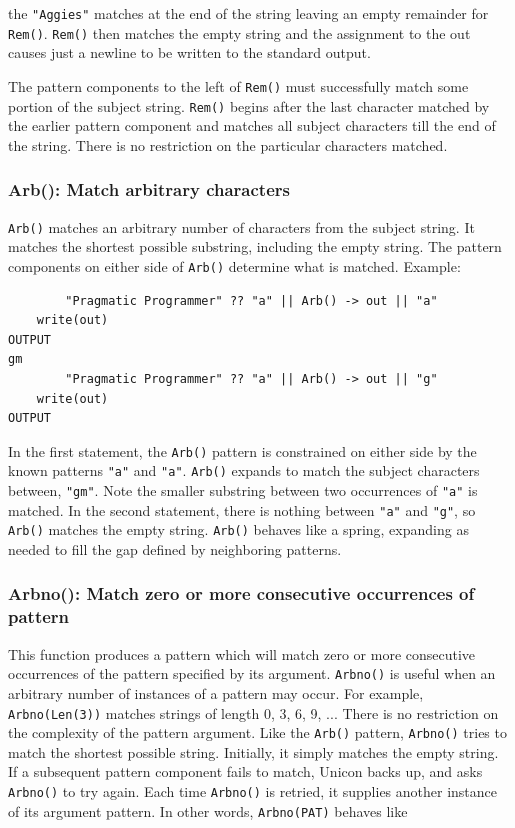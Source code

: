 \documentclass[letterpaper,12pt]{article}
\begin{document}
\noindent the {\tt "Aggies"} matches at the end of the string leaving an empty
remainder for {\tt Rem()}. {\tt Rem()} then matches the empty string
and the assignment to the out causes just a newline to be written to the
standard output.

The pattern components to the left of {\tt Rem()} must successfully match
some portion of the subject string. {\tt Rem()} begins after the last
character matched by the earlier pattern component and matches all
subject characters till the end of the string. There is no restriction
on the particular characters matched.

\subsubsection{Arb(): Match arbitrary characters}

{\tt Arb()} matches an arbitrary number of characters from the subject
string.  It matches the shortest possible substring, including the
empty string. The pattern components on either side of {\tt Arb()} determine
what is matched. Example:

\begin{verbatim}
        "Pragmatic Programmer" ?? "a" || Arb() -> out || "a"
	write(out)
OUTPUT
gm
        "Pragmatic Programmer" ?? "a" || Arb() -> out || "g"
	write(out)
OUTPUT

\end{verbatim}

In the first statement, the {\tt Arb()} pattern is constrained on either
side by the known patterns {\tt "a"} and {\tt "a"}.
{\tt Arb()} expands to match the
subject characters between, {\tt "gm"}. Note the smaller substring between
two occurrences of {\tt "a"} is matched. In the second statement, there is
nothing between {\tt "a"} and {\tt "g"}, so {\tt Arb()} matches the empty
string. {\tt Arb()} behaves like a spring, expanding as needed to fill the
gap defined by neighboring patterns.

\subsubsection{Arbno(): Match zero or more consecutive occurrences of pattern}

This function produces a pattern which will match zero or more
consecutive occurrences of the pattern specified by its
argument. {\tt Arbno()} is useful when an arbitrary number of instances of
a pattern may occur. For example, {\tt Arbno(Len(3))} matches strings of
length 0, 3, 6, 9, ... There is no restriction on the complexity of
the pattern argument.  Like the {\tt Arb()} pattern, {\tt Arbno()} tries to
match the shortest possible string. Initially, it simply matches the
empty string. If a subsequent pattern component fails to match, Unicon
backs up, and asks {\tt Arbno()} to try again. Each time {\tt Arbno()} is
retried, it supplies another instance of its argument pattern.  In
other words, {\tt Arbno(PAT)} behaves like
\end{document}
